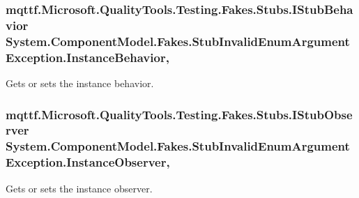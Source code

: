 \hypertarget{class_system_1_1_component_model_1_1_fakes_1_1_stub_invalid_enum_argument_exception_a951299c11cc4eff0ee00a2d7bd95504a}{
\subsubsection[{Instance\-Behavior}]{\setlength{\rightskip}{0pt plus 5cm}mqttf.\-Microsoft.\-Quality\-Tools.\-Testing.\-Fakes.\-Stubs.\-I\-Stub\-Behavior System.\-Component\-Model.\-Fakes.\-Stub\-Invalid\-Enum\-Argument\-Exception.\-Instance\-Behavior\hspace{0.3cm}{\ttfamily [get]}, {\ttfamily [set]}}}\label{class_system_1_1_component_model_1_1_fakes_1_1_stub_invalid_enum_argument_exception_a951299c11cc4eff0ee00a2d7bd95504a}


Gets or sets the instance behavior.

\hypertarget{class_system_1_1_component_model_1_1_fakes_1_1_stub_invalid_enum_argument_exception_a1af4659e96272c3faf3ecd018eaa2bd9}{
\subsubsection[{Instance\-Observer}]{\setlength{\rightskip}{0pt plus 5cm}mqttf.\-Microsoft.\-Quality\-Tools.\-Testing.\-Fakes.\-Stubs.\-I\-Stub\-Observer System.\-Component\-Model.\-Fakes.\-Stub\-Invalid\-Enum\-Argument\-Exception.\-Instance\-Observer\hspace{0.3cm}{\ttfamily [get]}, {\ttfamily [set]}}}\label{class_system_1_1_component_model_1_1_fakes_1_1_stub_invalid_enum_argument_exception_a1af4659e96272c3faf3ecd018eaa2bd9}


Gets or sets the instance observer.

